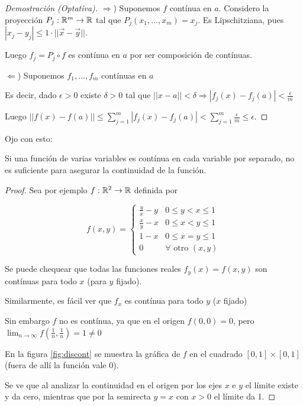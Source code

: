 \begin{proof}[Demostración (Optativa)]
$\Rightarrow$) Suponemos $f$ contínua en $a$. Considero la proyección $P_j : \mathbb{R}^m \to \mathbb{R}$ tal que $P_j(x_1, \ldots, x_m) = x_j$.  Es Lipschitziana, pues $|x_j - y_j| \leq 1 \cdot || \vec{x} - \vec{y} ||$.

Luego $f_j = P_j \circ f$ es contínua en $a$ por ser composición de contínuas.

$\Leftarrow$) Suponemos $f_1, \ldots, f_m$ contínuas en $a$

Es decir, dado $\epsilon > 0$ existe $\delta > 0$ tal que $||x-a|| < \delta \Rightarrow |f_j(x) - f_j(a)| < \frac{\epsilon}{m}$

Luego $|| f(x) - f(a) || \leq \sum_{j=1}^m |f_j(x) - f_j(a)| < \sum_{j=1}^m \frac{\epsilon}{m} \leq \epsilon$.
\end{proof}

Ojo con esto:

\begin{observation}
Si una función de varias variables es contínua en cada variable por separado, no es suficiente para asegurar la continuidad de la función.
\end{observation}

\begin{proof}
Sea por ejemplo $f: \mathbb{R}^2 \to \mathbb{R}$ definida por

$$f(x,y) = \begin{cases} 
\frac{y}{x} - y & 0 \leq y < x \leq 1 \\ 
\frac{x}{y} - x & 0 \leq x < y \leq 1 \\ 
1-x & 0 \leq x = y \leq 1 \\ 
0 & \forall \textrm{ otro } (x,y)  
\end{cases}$$

Se puede chequear que todas las funciones reales $f_y(x) = f(x,y)$ son contínuas para todo $x$ (para $y$ fijado).

Similarmente, es fácil ver que $f_x$ es contínua para todo $y$ ($x$ fijado)

Sin embargo $f$ no es contínua, ya que en el origen $f(0,0) = 0$, pero $\lim_{n \to \infty} f(\frac{1}{n}, \frac{1}{n}) = 1 \neq 0$

En la figura \ref{fig:discont} se muestra la gráfica de $f$ en el cuadrado $[0,1] \times [0,1]$ (fuera de allí la función vale 0).

Se ve que al analizar la continuidad en el origen por los ejes $x$ e $y$ el límite existe y da cero, mientras que por la semirecta $y=x$ con $x >0$ el límite da 1.
\end{proof}

